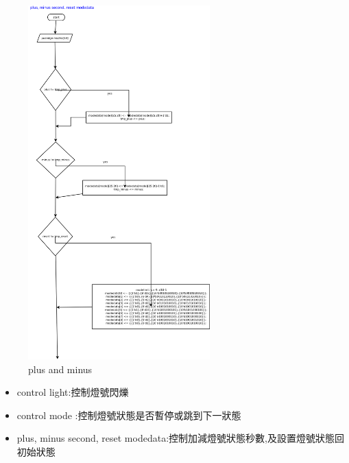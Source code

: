 \documentclass[11pt,a4paper]{article}
\begin{document}
\begin{figure}[H]
  \centering
  \includegraphics[width=7cm]{plusminus}
  \caption{plus and minus}
\end{figure}
\begin{itemize}
\item control light:控制燈號閃爍
\item control mode :控制燈號狀態是否暫停或跳到下一狀態
\item plus, minus second, reset modedata:控制加減燈號狀態秒數,及設置燈號狀態回初始狀態
\end{itemize}
\end{document}
